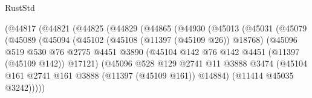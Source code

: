 \begin{lexlean}{RustStd}
\begin{coremodule}
                                (@44817
                                  (@44821
                                    (@44825
                                      (@44829
                                        (@44865
                                          (@44930
                                            (@45013
                                              (@45031
                                                (@45079
                                                  (@45089
                                                    (@45094
                                                      (@45102
                                                        (@45108 (@11397 (@45109 @26)) @18768)
                                                        (@45096
                                                          @519
                                                          @530
                                                          @76
                                                          @2775
                                                          @4451
                                                          @3890
                                                          (@45104
                                                            @142
                                                            @76
                                                            @142
                                                            @4451
                                                            (@11397 (@45109 @142))
                                                            @17121)
                                                          (@45096
                                                            @528
                                                            @129
                                                            @2741
                                                            @11
                                                            @3888
                                                            @3474
                                                            (@45104
                                                              @161
                                                              @2741
                                                              @161
                                                              @3888
                                                              (@11397 (@45109 @161))
                                                              @14884)
                                                            (@11414 @45035 @3242)))))

\end{coremodule}
\end{lexlean}
